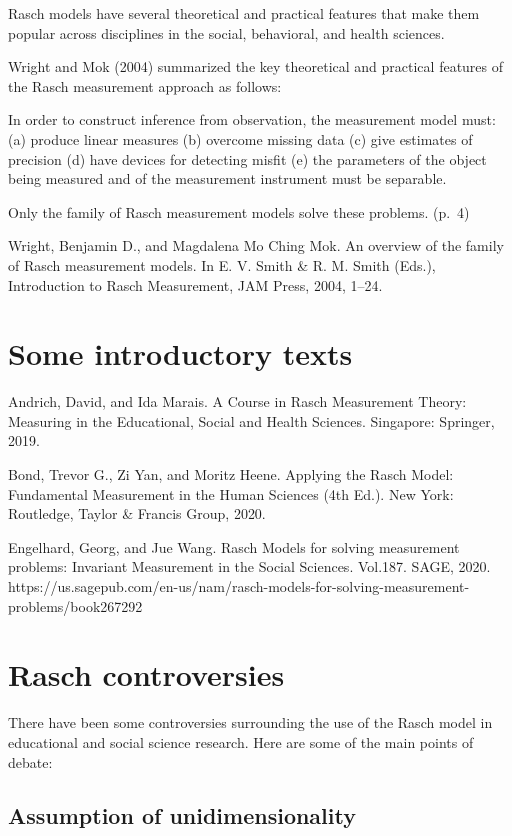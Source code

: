 \documentclass[
  letterpaper,
  DIV=11,
  numbers=noendperiod]{scrreprt}
\begin{document}
Rasch models have several theoretical and practical features that make
them popular across disciplines in the social, behavioral, and health
sciences.

Wright and Mok (2004) summarized the key theoretical and practical
features of the Rasch measurement approach as follows:

In order to construct inference from observation, the measurement model
must: (a) produce linear measures (b) overcome missing data (c) give
estimates of precision (d) have devices for detecting misfit (e) the
parameters of the object being measured and of the measurement
instrument must be separable.

Only the family of Rasch measurement models solve these problems. (p.~4)

Wright, Benjamin D., and Magdalena Mo Ching Mok. An overview of the
family of Rasch measurement models. In E. V. Smith \& R. M. Smith
(Eds.), Introduction to Rasch Measurement, JAM Press, 2004, 1--24.

\hypertarget{some-introductory-texts}{%
\section{Some introductory texts}\label{some-introductory-texts}}

Andrich, David, and Ida Marais. A Course in Rasch Measurement Theory:
Measuring in the Educational, Social and Health Sciences. Singapore:
Springer, 2019.

Bond, Trevor G., Zi Yan, and Moritz Heene. Applying the Rasch Model:
Fundamental Measurement in the Human Sciences (4th Ed.). New York:
Routledge, Taylor \& Francis Group, 2020.

Engelhard, Georg, and Jue Wang. Rasch Models for solving measurement
problems: Invariant Measurement in the Social Sciences. Vol.187. SAGE,
2020.
https://us.sagepub.com/en-us/nam/rasch-models-for-solving-measurement-problems/book267292

\hypertarget{rasch-controversies}{%
\section{Rasch controversies}\label{rasch-controversies}}

There have been some controversies surrounding the use of the Rasch
model in educational and social science research. Here are some of the
main points of debate:

\hypertarget{assumption-of-unidimensionality}{%
\subsection{Assumption of
unidimensionality}\label{assumption-of-unidimensionality}}
\end{document}
